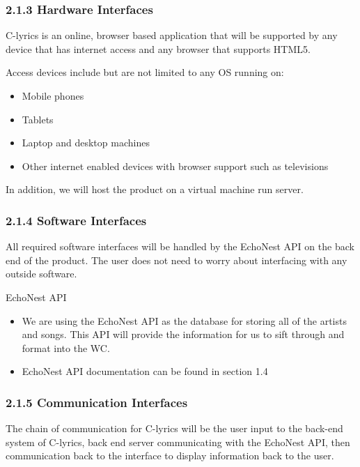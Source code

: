 \documentclass[]{article}
\begin{document}
\subsubsection{2.1.3 Hardware Interfaces}\label{hardware-interfaces}

C-lyrics is an online, browser based application that will be supported
by any device that has internet access and any browser that supports
HTML5.

Access devices include but are not limited to any OS running on:

\begin{itemize}
\itemsep1pt\parskip0pt
\item
  Mobile phones
\item
  Tablets
\item
  Laptop and desktop machines
\item
  Other internet enabled devices with browser support such as
  televisions
\end{itemize}

In addition, we will host the product on a virtual machine run server.

\subsubsection{2.1.4 Software Interfaces}\label{software-interfaces}

All required software interfaces will be handled by the EchoNest API on
the back end of the product. The user does not need to worry about
interfacing with any outside software.

EchoNest API

\begin{itemize}
\itemsep1pt\parskip0pt
\item
  We are using the EchoNest API as the database for storing all of the
  artists and songs. This API will provide the information for us to
  sift through and format into the WC.
\item
  EchoNest API documentation can be found in section 1.4
\end{itemize}

\subsubsection{2.1.5 Communication
Interfaces}\label{communication-interfaces}

The chain of communication for C-lyrics will be the user input to the
back-end system of C-lyrics, back end server communicating with the
EchoNest API, then communication back to the interface to display
information back to the user.
\end{document}
